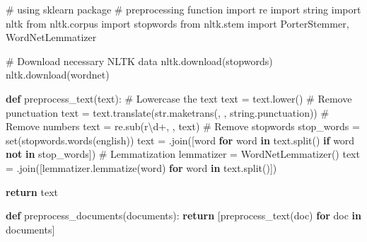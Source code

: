 \documentclass[
  letterpaper,
  DIV=11,
  numbers=noendperiod]{scrreprt}
\newenvironment{Shaded}{\begin{snugshade}}{\end{snugshade}}
\newcommand{\BuiltInTok}[1]{\textcolor[rgb]{0.00,0.23,0.31}{#1}}
\newcommand{\CommentTok}[1]{\textcolor[rgb]{0.37,0.37,0.37}{#1}}
\newcommand{\ControlFlowTok}[1]{\textcolor[rgb]{0.00,0.23,0.31}{\textbf{#1}}}
\newcommand{\DecValTok}[1]{\textcolor[rgb]{0.68,0.00,0.00}{#1}}
\newcommand{\ImportTok}[1]{\textcolor[rgb]{0.00,0.46,0.62}{#1}}
\newcommand{\KeywordTok}[1]{\textcolor[rgb]{0.00,0.23,0.31}{\textbf{#1}}}
\newcommand{\NormalTok}[1]{\textcolor[rgb]{0.00,0.23,0.31}{#1}}
\newcommand{\OperatorTok}[1]{\textcolor[rgb]{0.37,0.37,0.37}{#1}}
\newcommand{\StringTok}[1]{\textcolor[rgb]{0.13,0.47,0.30}{#1}}
\newcommand{\VerbatimStringTok}[1]{\textcolor[rgb]{0.13,0.47,0.30}{#1}}
\begin{document}
\begin{Shaded}
\begin{Highlighting}[]
\CommentTok{\# using sklearn package }
\CommentTok{\# preprocessing function }
\ImportTok{import}\NormalTok{ re}
\ImportTok{import}\NormalTok{ string}
\ImportTok{import}\NormalTok{ nltk}
\ImportTok{from}\NormalTok{ nltk.corpus }\ImportTok{import}\NormalTok{ stopwords}
\ImportTok{from}\NormalTok{ nltk.stem }\ImportTok{import}\NormalTok{ PorterStemmer, WordNetLemmatizer}

\CommentTok{\# Download necessary NLTK data}
\NormalTok{nltk.download(}\StringTok{\textquotesingle{}stopwords\textquotesingle{}}\NormalTok{)}
\NormalTok{nltk.download(}\StringTok{\textquotesingle{}wordnet\textquotesingle{}}\NormalTok{)}

\KeywordTok{def}\NormalTok{ preprocess\_text(text):}
    \CommentTok{\# Lowercase the text}
\NormalTok{    text }\OperatorTok{=}\NormalTok{ text.lower()}
    \CommentTok{\# Remove punctuation}
\NormalTok{    text }\OperatorTok{=}\NormalTok{ text.translate(}\BuiltInTok{str}\NormalTok{.maketrans(}\StringTok{\textquotesingle{}\textquotesingle{}}\NormalTok{, }\StringTok{\textquotesingle{}\textquotesingle{}}\NormalTok{, string.punctuation))}
    \CommentTok{\# Remove numbers}
\NormalTok{    text }\OperatorTok{=}\NormalTok{ re.sub(}\VerbatimStringTok{r\textquotesingle{}}\DecValTok{\textbackslash{}d}\OperatorTok{+}\VerbatimStringTok{\textquotesingle{}}\NormalTok{, }\StringTok{\textquotesingle{}\textquotesingle{}}\NormalTok{, text)}
    \CommentTok{\# Remove stopwords}
\NormalTok{    stop\_words }\OperatorTok{=} \BuiltInTok{set}\NormalTok{(stopwords.words(}\StringTok{\textquotesingle{}english\textquotesingle{}}\NormalTok{))}
\NormalTok{    text }\OperatorTok{=} \StringTok{\textquotesingle{} \textquotesingle{}}\NormalTok{.join([word }\ControlFlowTok{for}\NormalTok{ word }\KeywordTok{in}\NormalTok{ text.split() }\ControlFlowTok{if}\NormalTok{ word }\KeywordTok{not} \KeywordTok{in}\NormalTok{ stop\_words])}
    \CommentTok{\# Lemmatization}
\NormalTok{    lemmatizer }\OperatorTok{=}\NormalTok{ WordNetLemmatizer()}
\NormalTok{    text }\OperatorTok{=} \StringTok{\textquotesingle{} \textquotesingle{}}\NormalTok{.join([lemmatizer.lemmatize(word) }\ControlFlowTok{for}\NormalTok{ word }\KeywordTok{in}\NormalTok{ text.split()])}
    
    \ControlFlowTok{return}\NormalTok{ text}

\KeywordTok{def}\NormalTok{ preprocess\_documents(documents): }
    \ControlFlowTok{return}\NormalTok{ [preprocess\_text(doc) }\ControlFlowTok{for}\NormalTok{ doc }\KeywordTok{in}\NormalTok{ documents]}
\end{Highlighting}
\end{Shaded}
\end{document}
